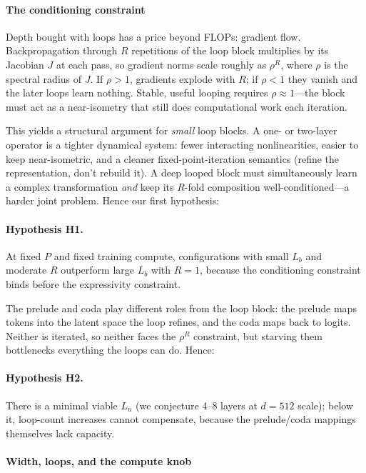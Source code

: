 \paragraph{The conditioning constraint}
\label{sec:conditioning}

Depth bought with loops has a price beyond FLOPs: gradient flow.
Backpropagation through $R$ repetitions of the loop block
multiplies by its Jacobian $J$ at each pass, so gradient norms
scale roughly as $\rho^R$, where $\rho$ is the spectral radius of
$J$. If $\rho > 1$, gradients explode with $R$; if $\rho < 1$
they vanish and the later loops learn nothing. Stable, useful
looping requires $\rho \approx 1$---the block must act as a
near-isometry that still does computational work each iteration.

This yields a structural argument for \emph{small} loop blocks. A
one- or two-layer operator is a tighter dynamical system: fewer
interacting nonlinearities, easier to keep near-isometric, and a
cleaner fixed-point-iteration semantics (refine the
representation, don't rebuild it). A deep looped block must
simultaneously learn a complex transformation \emph{and} keep its
$R$-fold composition well-conditioned---a harder joint problem.
Hence our first hypothesis:

\paragraph{Hypothesis H1.} At fixed $P$ and fixed training
compute, configurations with small $L_b$ and moderate $R$
outperform large $L_b$ with $R = 1$, because the conditioning
constraint binds before the expressivity constraint.

The prelude and coda play different roles from the loop block:
the prelude maps tokens into the latent space the loop refines,
and the coda maps back to logits. Neither is iterated, so
neither faces the $\rho^R$ constraint, but starving them
bottlenecks everything the loops can do. Hence:

\paragraph{Hypothesis H2.} There is a minimal viable $L_u$ (we
conjecture 4--8 layers at $d = 512$ scale); below it, loop-count
increases cannot compensate, because the prelude/coda mappings
themselves lack capacity.

\paragraph{Width, loops, and the compute knob}
\label{sec:width}

